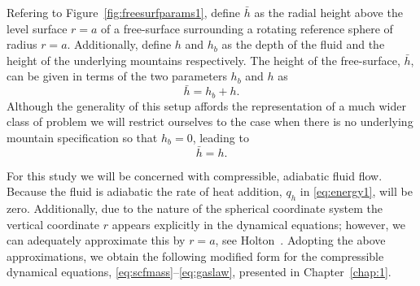 Refering to Figure~\ref{fig:freesurfparams1}, define $\bar{h}$ as the radial height above the level surface $r=a$ of a free-surface surrounding a rotating reference sphere of radius $r=a$.  Additionally, define $h$ and $h_b$ as the depth of the fluid and the height of the underlying mountains respectively. The height of the free-surface, $\bar{h}$, can be given in terms of the two parameters $h_b$ and $h$ as
\begin{equation}
	\bar{h}=h_b+h.
\end{equation}
Although the generality of this setup affords the representation of a much wider class of problem we will restrict ourselves to the case when there is no underlying mountain specification so that $h_b=0$, leading to
\begin{equation}
	\bar{h}=h. \label{eq:hequalhbar}
\end{equation}

For this study we will be concerned with compressible, adiabatic fluid flow. Because the fluid is adiabatic the rate of heat addition, $q_h$ in \eqref{eq:energy1}, will be zero. Additionally, due to the nature of the spherical coordinate system the vertical coordinate $r$ appears explicitly in the dynamical equations; however, we can adequately approximate this by $r=a$, see Holton~\cite{Holton:IDM}. Adopting the above approximations, we obtain the following modified form for the compressible dynamical equations, \eqref{eq:scfmass}--\eqref{eq:gaslaw}, presented in Chapter~\ref{chap:1}.

